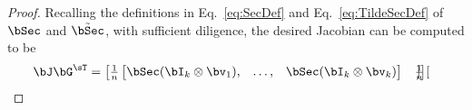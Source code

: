 \begin{proof}
Recalling the definitions in Eq.~\eqref{eq:SecDef} and Eq.~\eqref{eq:TildeSecDef} of $\bSec$ and $\tilde\bSec$, with sufficient diligence, the desired Jacobian can be computed to be 
\begin{align}
    \bJ\bG^\sT &= \begin{bmatrix}
    \frac1n
     \begin{bmatrix}
         \bSec (\bI_k \otimes \bv_1),& \dots ,&
         \bSec (\bI_k \otimes \bv_k) 
    \end{bmatrix} 
&
   \frac1n
     \begin{bmatrix}

\end{bmatrix}
\end{bmatrix}
\end{align}
\end{proof}

